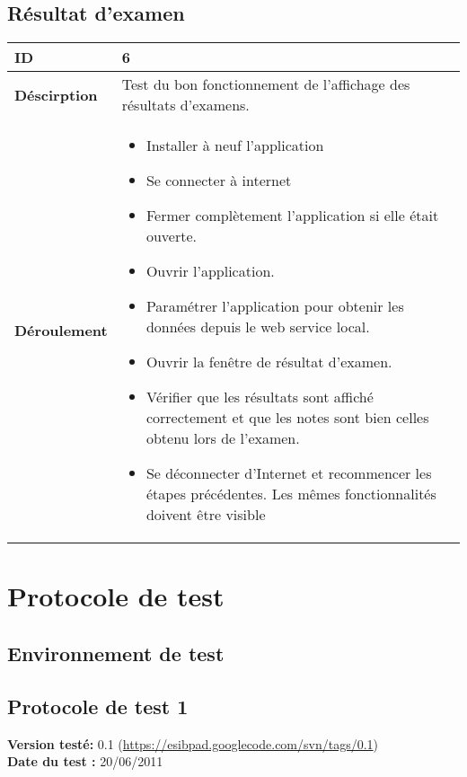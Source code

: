		\subsection{Résultat d'examen}
					 \begin{longtable}{m{4cm}|p{10cm}|}
					 \textbf{ ID} & 6 \\
					 \hline \textbf{Déscirption} & Test du bon fonctionnement de l'affichage des résultats d'examens.\\
					 \hline \textbf{Déroulement} &
						 \begin{itemize}
						  	\item Installer à neuf l'application
						  	\item Se connecter à internet
							 \item Fermer complètement l'application si elle était ouverte.
							 \item Ouvrir l'application.
							 \item Paramétrer l'application pour obtenir les données depuis le web service local.
							 \item Ouvrir la fenêtre de résultat d'examen.
							 \item Vérifier que les résultats sont affiché correctement et que les notes sont bien celles obtenu lors de l'examen.
							\item Se déconnecter d'Internet et recommencer les étapes précédentes. Les mêmes fonctionnalités doivent être visible
						 \end{itemize}
					 \\
				 \end{longtable} 
\section{Protocole de test}
		\subsection{Environnement de test}
		\subsection{Protocole de test 1}
		\textbf{Version testé:} 0.1 (\url{https://esibpad.googlecode.com/svn/tags/0.1}) \\
		\textbf{	Date du test :} 20/06/2011

